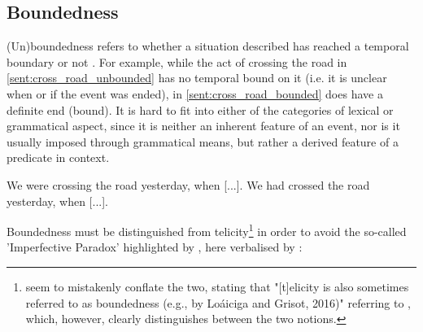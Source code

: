 \subsection{Boundedness}
\label{sect:boundedness}
(Un)boundedness refers to whether a situation described has reached a temporal boundary or not \citep{6608d9d0-a477-39af-8491-2172df5ae612}. For example, while the act of crossing the road in \ref{sent:cross_road_unbounded} has no temporal bound on it (i.e. it is unclear when or if the event was ended), in \ref{sent:cross_road_bounded} does have a definite end (bound). It is hard to fit into either of the categories of lexical or grammatical aspect, since it is neither an inherent feature of an event, nor is it usually imposed through grammatical means, but rather a derived feature of a predicate in context.

\begin{exe}
    \ex We were crossing the road yesterday, when [...].
    \label{sent:cross_road_unbounded}
    \ex We had crossed the road yesterday, when [...].
    \label{sent:cross_road_bounded}
\end{exe}
Boundedness must be distinguished from telicity\footnote{\citet{friedrich-etal-2023-kind} seem to mistakenly conflate the two, stating that "[t]elicity is also sometimes referred to as boundedness (e.g., by Loáiciga and Grisot, 2016)" referring to \citet{loaiciga-grisot-2016-predicting}, which, however, clearly distinguishes between the two notions.} in order to avoid the so-called 'Imperfective Paradox' highlighted by \citet{Linguistics2005DowtyD1}, here verbalised by \citet{zucchi}:


